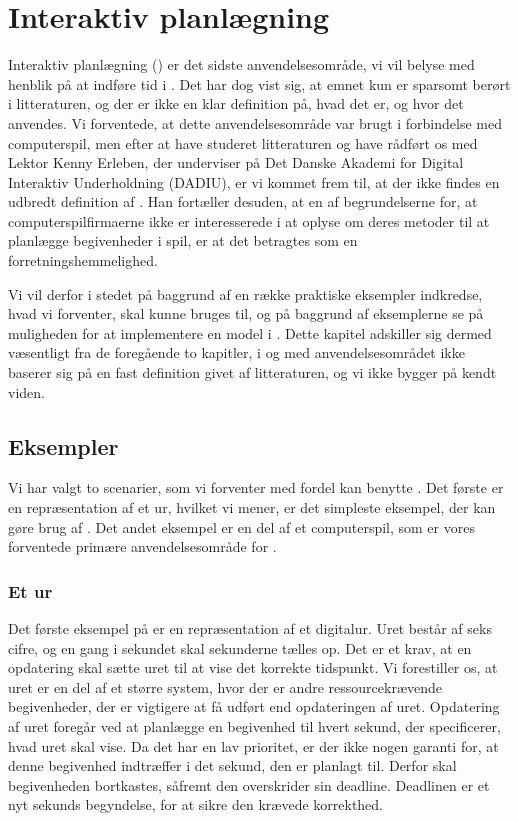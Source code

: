 \chapter{Interaktiv planlægning}
\label{chap:is}
Interaktiv planlægning (\is) er det sidste anvendelsesområde, vi vil belyse med henblik på at indføre tid i \pycsp. Det har dog vist sig, at emnet kun er sparsomt berørt i litteraturen, og der er ikke en klar definition på, hvad det er, og hvor det anvendes. 
Vi forventede, at dette anvendelsesområde var brugt i forbindelse med computerspil, men efter at have studeret litteraturen og have rådført os med Lektor Kenny Erleben, der underviser på Det Danske Akademi for Digital Interaktiv Underholdning (DADIU), er vi kommet frem til, at der ikke findes en udbredt definition af \is. Han fortæller desuden, at en af begrundelserne for, at computerspilfirmaerne ikke er interesserede i at oplyse om deres metoder til at planlægge begivenheder i spil, er at det  betragtes som en  forretningshemmelighed. 

Vi vil derfor i stedet på baggrund af en række praktiske eksempler indkredse, hvad vi forventer, \is skal kunne bruges til, og på baggrund af eksemplerne se på muligheden for at implementere en model i \pycsp. Dette kapitel adskiller sig dermed væsentligt fra de foregående to kapitler, i og med anvendelsesområdet ikke baserer sig på en fast definition givet af litteraturen, og vi ikke bygger på kendt viden.

\section{Eksempler}
Vi har valgt to scenarier, som vi forventer med fordel kan benytte \is. Det første er en repræsentation af et ur, hvilket vi mener, er det simpleste eksempel, der kan gøre brug af \is. Det andet eksempel er en del af et computerspil, som er vores forventede primære anvendelsesområde for \is. 

\subsection{Et ur}
Det første eksempel på \is er en repræsentation af et digitalur. Uret består af seks cifre, og en gang i sekundet skal sekunderne tælles op. Det er et  krav, at en opdatering skal sætte uret til at vise det korrekte tidspunkt. Vi forestiller os, at uret er en del af et større system, hvor der er andre ressourcekrævende begivenheder, der er vigtigere at få udført end opdateringen af uret. Opdatering af uret foregår ved at planlægge en begivenhed til hvert sekund, der specificerer, hvad uret skal vise. Da det har en lav prioritet, er der ikke nogen garanti for, at denne begivenhed indtræffer i det sekund, den er planlagt til. Derfor skal begivenheden  bortkastes, såfremt den overskrider sin deadline. Deadlinen er et nyt sekunds begyndelse, for at sikre den krævede korrekthed. 

